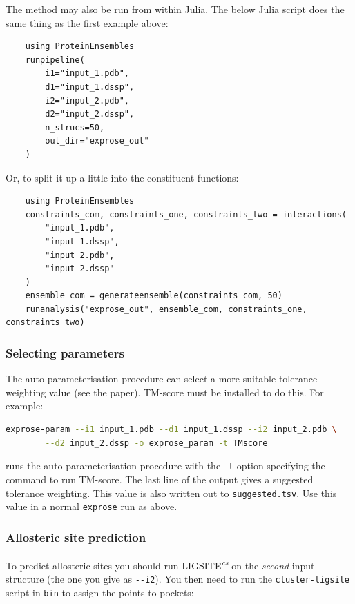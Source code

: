 The method may also be run from within Julia. The below Julia script does the same thing as the first example above:

\begin{lstlisting}
    using ProteinEnsembles
    runpipeline(
        i1="input_1.pdb",
        d1="input_1.dssp",
        i2="input_2.pdb",
        d2="input_2.dssp",
        n_strucs=50,
        out_dir="exprose_out"
    )
\end{lstlisting}

Or, to split it up a little into the constituent functions:

\begin{lstlisting}
    using ProteinEnsembles
    constraints_com, constraints_one, constraints_two = interactions(
        "input_1.pdb",
        "input_1.dssp",
        "input_2.pdb",
        "input_2.dssp"
    )
    ensemble_com = generateensemble(constraints_com, 50)
    runanalysis("exprose_out", ensemble_com, constraints_one, constraints_two)
\end{lstlisting}


\subsubsection{Selecting parameters}

The auto-parameterisation procedure can select a more suitable tolerance weighting value (see the paper). TM-score must be installed to do this. For example:

\begin{lstlisting}[language=bash]
    exprose-param --i1 input_1.pdb --d1 input_1.dssp --i2 input_2.pdb \
        --d2 input_2.dssp -o exprose_param -t TMscore
\end{lstlisting}

runs the auto-parameterisation procedure with the \verb|-t| option specifying the command to run TM-score. The last line of the output gives a suggested tolerance weighting. This value is also written out to \verb|suggested.tsv|. Use this value in a normal \verb|exprose| run as above.


\subsubsection{Allosteric site prediction}

To predict allosteric sites you should run LIGSITE\textsuperscript{\it cs} on the \emph{second} input structure (the one you give as \verb|--i2|). You then need to run the \verb|cluster-ligsite| script in \verb|bin| to assign the points to pockets:

